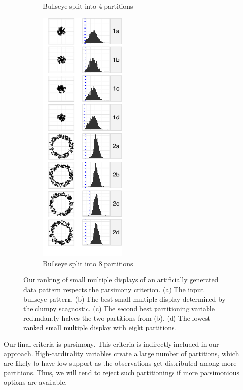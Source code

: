 \begin{figure}[t]
\begin{minipage}[b]{1.7in}
\begin{subfigure}[b]{\linewidth}
        \vspace{-0.5cm}
        \caption{Bullseye split into 4 partitions}
      \label{fig:pars3}        
      \end{subfigure}
    \end{minipage}
    \begin{subfigure}[b]{1.7in}
	\includegraphics[width=1.7in]{images/5_12851615653375-cluster2.pdf}
        \vspace{-0.5cm}
      \caption{Bullseye split into 8 partitions}
      \label{fig:pars4}
    \end{subfigure}
    \caption{Our ranking of small multiple displays of an artificially generated data pattern respects the parsimony criterion. (a) The input bullseye pattern. (b) The best small multiple display determined by the clumpy scagnostic. (c) The second best partitioning variable redundantly halves the two partitions from (b). (d) The lowest ranked small multiple display with eight partitions.}
    \label{fig:parsimonious}
  \end{figure}

Our final criteria is parsimony. This criteria is indirectly included in our approach. High-cardinality variables create a large number of partitions, which are likely to have low support as the observations get distributed among more partitions. Thus, we will tend to reject such partitionings if more parsimonious options are available.
 
